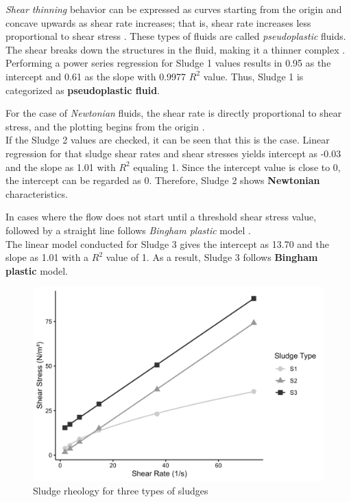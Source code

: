 \documentclass[a4paper]{article}
\begin{document}
\begin{sludgenum}
    \item \textsl{Shear thinning} behavior can be expressed as curves starting from the origin and concave upwards as shear rate increases; that is, shear rate increases less proportional to shear stress \autocite{Rao2014}. These types of fluids are called \textit{pseudoplastic} fluids. The shear breaks down the structures in the fluid, making it a thinner complex \autocite{sanin2011, dick1967}.\\
    Performing a power series regression for Sludge 1 values results in 0.95 as the intercept and 0.61 as the slope with 0.9977 $R^2$ value. Thus, Sludge 1 is categorized as \textbf{pseudoplastic fluid}.
    \item For the case of \textsl{Newtonian} fluids, the shear rate is directly proportional to shear stress, and the plotting begins from the origin \autocite{Rao2014}.\\
    If the Sludge 2 values are checked, it can be seen that this is the case. Linear regression for that sludge shear rates and shear stresses yields intercept as -0.03 and the slope as 1.01 with $R^2$ equaling 1. Since the intercept value is close to 0, the intercept can be regarded as 0. Therefore, Sludge 2 shows \textbf{Newtonian} characteristics.
    \item In cases where the flow does not start until a threshold shear stress value, followed by a straight line follows \textsl{Bingham plastic} model \autocite{Rao2014}.\\
    The linear model conducted for Sludge 3 gives the intercept as 13.70 and the slope as 1.01 with a $R^2$ value of 1. As a result, Sludge 3 follows \textbf{Bingham plastic} model.
\end{sludgenum}
\begin{figure}[ht]
    \centering
    \includegraphics[scale=1]{homeworks/hw2/sludgeShear.png}
    \caption{Sludge rheology for three types of sludges}
    \label{fig:SludgeShear}
\end{figure}
\end{document}
